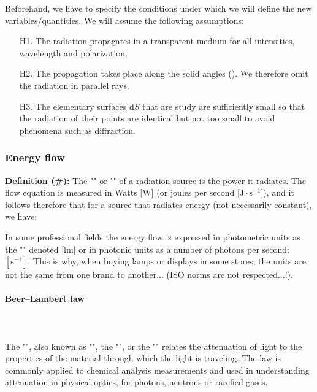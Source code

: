 	Beforehand, we have to specify the conditions under which we will define the new variables/quantities. We will assume the following assumptions:
	\begin{enumerate}
		\item[H1.] The radiation propagates in a transparent medium for all intensities, wavelength and polarization.
		
		\item[H2.] The propagation takes place along the solid angles (). We therefore omit the radiation in parallel rays.
		
		\item[H3.] The elementary surfaces $\mathrm{d}S$ that are study are sufficiently small so that the radiation of their points are identical but not too small to avoid phenomena such as diffraction.
	\end{enumerate}
	
	\subsubsection{Energy flow} 
	\textbf{Definition (\#\mydef):} The "" or "\label{radiant flow}" of a radiation source is the power it radiates. The flow equation is measured in Watts [W] (or joules per second [$\text{J}\cdot \text{s}^{-1}$]), and it follows therefore that for a source that radiates energy (not necessarily constant), we have:
	
	In some professional fields the energy flow is expressed in photometric units as the "" denoted [lm] or in photonic units as a number of photons per second: $[\text{s}^{-1}]$. This is why, when buying lamps or displays in some stores, the units are not the same from one brand to another... (ISO norms are not respected...!).
	
	\paragraph{Beer–Lambert law}\mbox{}\\\\
	The "", also known as "", the "", or the "" relates the attenuation of light to the properties of the material through which the light is traveling. The law is commonly applied to chemical analysis measurements and used in understanding attenuation in physical optics, for photons, neutrons or rarefied gases.
	
